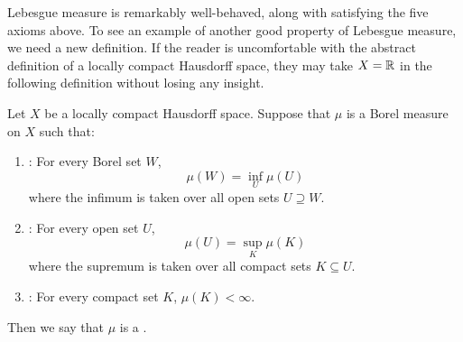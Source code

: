 \begin{subsec}
Lebesgue measure is remarkably well-behaved, along with satisfying the five axioms above.
To see an example of another good property of Lebesgue measure, we need a new definition.
If the reader is uncomfortable with the abstract definition of a locally compact Hausdorff space, they may take $X = \mathbb{R}$ in the following definition without losing any insight.
\end{subsec}

\begin{definition}\label{dfn of radon measure}
Let $X$ be a locally compact Hausdorff space.
Suppose that $\mu$ is a Borel measure on $X$ such that:
\begin{enumerate}
\item {}: For every Borel set $W$,
\[\mu(W) = \inf_{U} \mu(U)\]
where the infimum is taken over all open sets $U \supseteq W$.
\item {}: For every open set $U$,
\[\mu(U) = \sup_{K} \mu(K)\]
where the supremum is taken over all compact sets $K \subseteq U$.
\item {}: For every compact set $K$, $\mu(K) < \infty$.
\end{enumerate}
Then we say that $\mu$ is a .
\end{definition}

